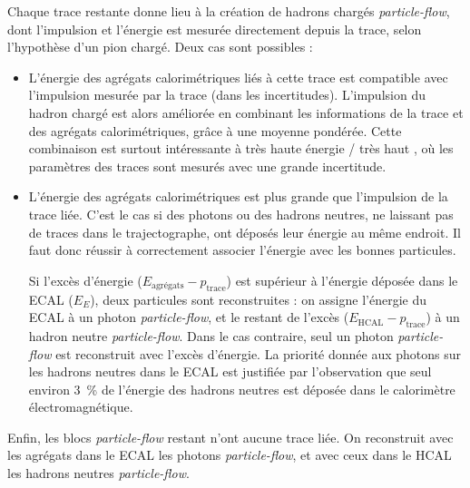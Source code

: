 Chaque trace restante donne lieu à la création de hadrons chargés \emph{particle-flow}, dont l'impulsion et l'énergie est mesurée directement depuis la trace, selon l'hypothèse d'un pion chargé. Deux cas sont possibles :
\begin{itemize}
    \item L'énergie des agrégats calorimétriques liés à cette trace est compatible avec l'impulsion mesurée par la trace (dans les incertitudes). L'impulsion du hadron chargé est alors améliorée en combinant les informations de la trace et des agrégats calorimétriques, grâce à une moyenne pondérée. Cette combinaison est surtout intéressante à très haute énergie / très haut \aeta, où les paramètres des traces sont mesurés avec une grande incertitude.
    \item L'énergie des agrégats calorimétriques est plus grande que l'impulsion de la trace liée. C'est le cas si des photons ou des hadrons neutres, ne laissant pas de traces dans le trajectographe, ont déposés leur énergie au même endroit. Il faut donc réussir à correctement associer l'énergie avec les bonnes particules.

    \smallskip

    Si l'excès d'énergie ($E_\text{agrégats} - p_\text{trace}$) est supérieur à l'énergie déposée dans le ECAL ($E_E$), deux particules sont reconstruites : on assigne l'énergie du ECAL à un photon \emph{particle-flow}, et le restant de l'excès ($E_\text{HCAL} - p_\text{trace}$) à un hadron neutre \emph{particle-flow}. Dans le cas contraire, seul un photon \emph{particle-flow} est reconstruit avec l'excès d'énergie. La priorité donnée aux photons sur les hadrons neutres dans le ECAL est justifiée par l'observation que seul environ \SI{3}{\%} de l'énergie des hadrons neutres est déposée dans le calorimètre électromagnétique.
\end{itemize}

Enfin, les blocs \emph{particle-flow} restant n'ont aucune trace liée. On reconstruit avec les agrégats dans le ECAL les photons \emph{particle-flow}, et avec ceux dans le HCAL les hadrons neutres \emph{particle-flow}.


